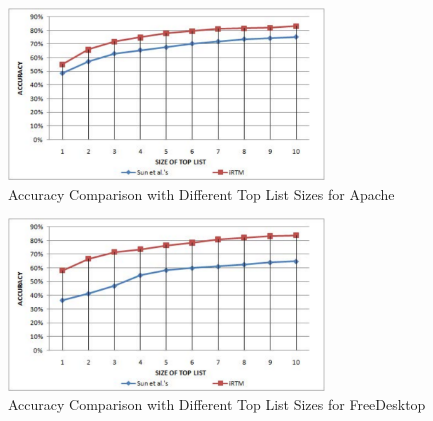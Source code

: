 
\begin{figure}[t]
\centering
\includegraphics[width=3.3in]{apache}
\caption{Accuracy Comparison with Different Top List Sizes for Apache}
\label{apache}
\end{figure}


\begin{figure}[t]
\centering
\includegraphics[width=3.3in]{freedesktop}
\caption{Accuracy Comparison with Different Top List Sizes for FreeDesktop}
\label{freedesktop}
\end{figure}


